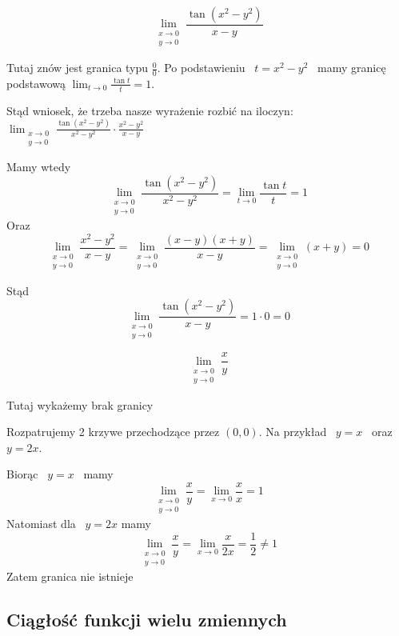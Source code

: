 \begin{przyklad}

$$ \lim_{\substack{x \to 0 \\ y \to 0}} \frac{\tan (x^2 - y^2)}{x - y} $$

Tutaj znów jest granica typu $ \frac{0}{0} $. Po podstawieniu \ $ t = x^2 - y^2 $ \ mamy granicę podstawową
$ \lim_{t \to 0} \frac{\tan t}{t} = 1 $.

Stąd wniosek, że trzeba nasze wyrażenie rozbić na iloczyn: 
$ \lim_{\substack{x \to 0 \\ y \to 0}} \frac{\tan (x^2 - y^2)}{x^2 - y^2} \cdot \frac{x^2 - y^2}{x - y} $

Mamy wtedy
$$ \lim_{\substack{x \to 0 \\ y \to 0}} \frac{\tan (x^2 - y^2)}{x^2 - y^2} = \lim_{t \to 0} \frac{\tan t}{t} = 1 $$
Oraz
$$ \lim_{\substack{x \to 0 \\ y \to 0}} \frac{x^2 - y^2}{x - y} = \lim_{\substack{x \to 0 \\ y \to 0}} \frac{(x - y)(x + y)}{x - y}
= \lim_{\substack{x \to 0 \\ y \to 0}} (x + y) = 0 $$

Stąd 
$$ \lim_{\substack{x \to 0 \\ y \to 0}} \frac{\tan (x^2 - y^2)}{x - y} = 1 \cdot 0 = 0 $$
\end{przyklad}

\begin{przyklad}

$$ \lim_{\substack{x \to 0 \\ y \to 0}} \frac{x}{y} $$

Tutaj wykażemy brak granicy

Rozpatrujemy 2 krzywe przechodzące przez $(0,0)$. Na przykład \ $ y = x $ \ oraz \ $ y = 2x $.

Biorąc \ $ y = x $ \ mamy
$$ \lim_{\substack{x \to 0 \\ y \to 0}} \frac{x}{y} = \lim_{x \to 0} \frac{x}{x} = 1 $$
Natomiast dla \ $ y = 2x $ mamy
$$ \lim_{\substack{x \to 0 \\ y \to 0}} \frac{x}{y} = \lim_{x \to 0} \frac{x}{2x} = \frac{1}{2} \neq 1 $$
Zatem granica nie istnieje
\end{przyklad}

\subsection*{Ciągłość funkcji wielu zmiennych}

